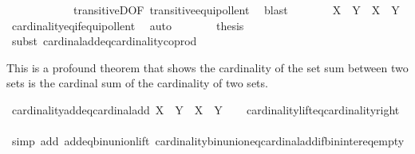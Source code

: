 \begin{isabellebody}
\ \ \ \ \ \ \ \ \ \ \ \ transitiveD{\isacharbrackleft}{\kern0pt}OF\ transitive{\isacharunderscore}{\kern0pt}equipollent{\isacharbrackright}{\kern0pt}\ \isamarkupfalse%
\ blast\isanewline
\ \ \ \ \isamarkupfalse%
\ \isamarkupfalse%
\ {\isachardoublequoteopen}{\isacharbar}{\kern0pt}X\ {\isasymunion}\ Y{\isacharbar}{\kern0pt}\ {\isacharequal}{\kern0pt}\ {\isacharbar}{\kern0pt}{\isacharbar}{\kern0pt}X{\isacharbar}{\kern0pt}\ {\isasymCoprod}\ {\isacharbar}{\kern0pt}Y{\isacharbar}{\kern0pt}{\isacharbar}{\kern0pt}{\isachardoublequoteclose}\ \isamarkupfalse%
\ cardinality{\isacharunderscore}{\kern0pt}eq{\isacharunderscore}{\kern0pt}if{\isacharunderscore}{\kern0pt}equipollent\ \isamarkupfalse%
\ auto\isanewline
\ \ \ \ \isamarkupfalse%
\ \isamarkupfalse%
\ {\isacharquery}{\kern0pt}thesis\ \isamarkupfalse%
\ {\isacharparenleft}{\kern0pt}subst\ cardinal{\isacharunderscore}{\kern0pt}add{\isacharunderscore}{\kern0pt}eq{\isacharunderscore}{\kern0pt}cardinality{\isacharunderscore}{\kern0pt}coprod{\isacharparenright}{\kern0pt}\isanewline
\ \ \ \ \ \ \ \ \isamarkupfalse%
\isanewline
\ \ \ \ \ \ \isamarkupfalse%
%
\endisatagproof
{\isafoldproof}%
%
\isadelimproof
%
\endisadelimproof
%
\begin{isamarkuptext}%
This is a profound theorem that shows the cardinality of the set sum between two sets is 
the cardinal sum of the cardinality of two sets.%
\end{isamarkuptext}\isamarkuptrue%
\isamarkupfalse%
\ cardinality{\isacharunderscore}{\kern0pt}add{\isacharunderscore}{\kern0pt}eq{\isacharunderscore}{\kern0pt}cardinal{\isacharunderscore}{\kern0pt}add{\isacharcolon}{\kern0pt}\ {\isachardoublequoteopen}{\isacharbar}{\kern0pt}X\ {\isacharplus}{\kern0pt}\ Y{\isacharbar}{\kern0pt}\ {\isacharequal}{\kern0pt}\ {\isacharbar}{\kern0pt}X{\isacharbar}{\kern0pt}\ {\isasymoplus}\ {\isacharbar}{\kern0pt}Y{\isacharbar}{\kern0pt}{\isachardoublequoteclose}\isanewline
%
\isadelimproof
\ \ %
\endisadelimproof
%
\isatagproof
{}\isamarkupfalse%
\ cardinality{\isacharunderscore}{\kern0pt}lift{\isacharunderscore}{\kern0pt}eq{\isacharunderscore}{\kern0pt}cardinality{\isacharunderscore}{\kern0pt}right\isanewline
\ \ \isamarkupfalse%
\ {\isacharparenleft}{\kern0pt}simp\ add{\isacharcolon}{\kern0pt}\ add{\isacharunderscore}{\kern0pt}eq{\isacharunderscore}{\kern0pt}bin{\isacharunderscore}{\kern0pt}union{\isacharunderscore}{\kern0pt}lift\ cardinality{\isacharunderscore}{\kern0pt}bin{\isacharunderscore}{\kern0pt}union{\isacharunderscore}{\kern0pt}eq{\isacharunderscore}{\kern0pt}cardinal{\isacharunderscore}{\kern0pt}add{\isacharunderscore}{\kern0pt}if{\isacharunderscore}{\kern0pt}bin{\isacharunderscore}{\kern0pt}inter{\isacharunderscore}{\kern0pt}eq{\isacharunderscore}{\kern0pt}empty{\isacharparenright}{\kern0pt}%
\endisatagproof
{\isafoldproof}%
%
\isadelimproof
\isanewline
%
\endisadelimproof
%
\isadelimtheory
\isanewline
%
\endisadelimtheory
%
\isatagtheory
{}\isamarkupfalse%
%
\endisatagtheory
{\isafoldtheory}%
%
\isadelimtheory
%
\endisadelimtheory
%
\end{isabellebody}%
